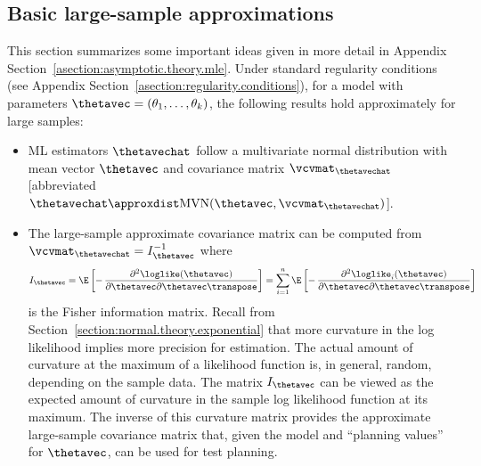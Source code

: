 \subsection{Basic large-sample approximations}
\label{subsection:basic.lgsamp.approx}
This section summarizes some important ideas given in more detail in
Appendix Section~\ref{asection:asymptotic.theory.mle}.
Under standard regularity conditions 
(see Appendix Section~\ref{asection:regularity.conditions}), for a model with
parameters $\thetavec=(\theta_{1},\ldots,\theta_{k})$, the
following results hold approximately for large samples:
\begin{itemize}
\item
ML estimators $\thetavechat$ follow a multivariate normal
distribution with mean vector $\thetavec$ and covariance matrix
$\vcvmat_{\thetavechat}$ [abbreviated $\thetavechat \approxdist
\mbox{MVN}(\thetavec,\vcvmat_{\thetavechat})$].
\item
The large-sample approximate covariance matrix can be computed from
$\vcvmat_{\thetavechat}=I_{\thetavec}^{-1}$ where
\begin{equation}
\label{equation:planning.fisher.info}
     I_{\thetavec}= 
     \E \left [
    -\,\frac{\partial ^2 \loglike(\thetavec)}{\partial \thetavec
      \partial \thetavec \transpose}\right ]
      =
\sum^{n}_{i=1} \E\left [-\,\frac{\partial ^2
\loglike_{i}(\thetavec)}{\partial \thetavec
\partial \thetavec \transpose}\right ]
\end{equation}
is the Fisher information matrix. Recall from
Section~\ref{section:normal.theory.exponential} that more curvature
in the log likelihood implies more precision for estimation. The
actual amount of curvature at the maximum of a likelihood function
is, in general, random, depending on the sample data. The matrix
$I_{\thetavec}$ can be viewed as the expected amount of curvature in
the sample log likelihood function at its maximum.  The inverse of
this curvature matrix provides the approximate large-sample
covariance matrix that, given the model and ``planning values'' for
$\thetavec$, can be used for test planning.
\end{itemize}

